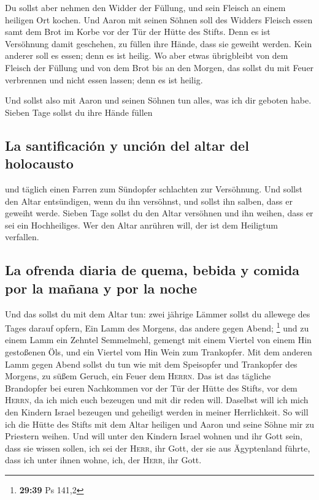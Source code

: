  Du sollst aber nehmen den Widder der Füllung, und sein
Fleisch an einem heiligen Ort kochen.  Und Aaron mit
seinen Söhnen soll des Widders Fleisch essen samt dem Brot im Korbe vor
der Tür der Hütte des Stifts.  Denn es ist Versöhnung
damit geschehen, zu füllen ihre Hände, dass sie geweiht werden. Kein
anderer soll es essen; denn es ist heilig.  Wo aber etwas
übrigbleibt von dem Fleisch der Füllung und von dem Brot bis an den
Morgen, das sollst du mit Feuer verbrennen und nicht essen lassen; denn
es ist heilig.

 Und sollst also mit Aaron und seinen Söhnen tun alles,
was ich dir geboten habe. Sieben Tage sollst du ihre Hände füllen

\hypertarget{la-santificaciuxf3n-y-unciuxf3n-del-altar-del-holocausto}{%
\subsection{La santificación y unción del altar del
holocausto}\label{la-santificaciuxf3n-y-unciuxf3n-del-altar-del-holocausto}}

 und täglich einen Farren zum Sündopfer schlachten zur
Versöhnung. Und sollst den Altar entsündigen, wenn du ihn versöhnst, und
sollst ihn salben, dass er geweiht werde.  Sieben Tage
sollst du den Altar versöhnen und ihn weihen, dass er sei ein
Hochheiliges. Wer den Altar anrühren will, der ist dem Heiligtum
verfallen.

\hypertarget{la-ofrenda-diaria-de-quema-bebida-y-comida-por-la-mauxf1ana-y-por-la-noche}{%
\subsection{La ofrenda diaria de quema, bebida y comida por la mañana y
por la
noche}\label{la-ofrenda-diaria-de-quema-bebida-y-comida-por-la-mauxf1ana-y-por-la-noche}}

 Und das sollst du mit dem Altar tun: zwei jährige Lämmer
sollst du allewege des Tages darauf opfern,  Ein Lamm des
Morgens, das andere gegen Abend; \footnote{\textbf{29:39} Ps 141,2}
 und zu einem Lamm ein Zehntel Semmelmehl, gemengt mit
einem Viertel von einem Hin gestoßenen Öls, und ein Viertel vom Hin Wein
zum Trankopfer.  Mit dem anderen Lamm gegen Abend sollst
du tun wie mit dem Speisopfer und Trankopfer des Morgens, zu süßem
Geruch, ein Feuer dem \textsc{Herrn}.  Das ist das
tägliche Brandopfer bei euren Nachkommen vor der Tür der Hütte des
Stifts, vor dem \textsc{Herrn}, da ich mich euch bezeugen und mit dir
reden will.  Daselbst will ich mich den Kindern Israel
bezeugen und geheiligt werden in meiner Herrlichkeit.  So
will ich die Hütte des Stifts mit dem Altar heiligen und Aaron und seine
Söhne mir zu Priestern weihen.  Und will unter den
Kindern Israel wohnen und ihr Gott sein,  dass sie wissen
sollen, ich sei der \textsc{Herr}, ihr Gott, der sie aus Ägyptenland
führte, dass ich unter ihnen wohne, ich, der \textsc{Herr}, ihr Gott.

